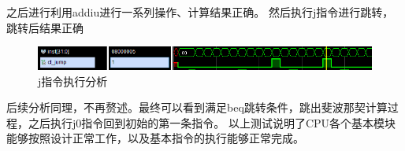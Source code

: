 \documentclass[]{USTBReport}
\begin{document}
    之后进行利用addiu进行一系列操作、计算结果正确。
    然后执行j指令进行跳转，跳转后结果正确
    \begin{figure}[H]
        \centering
        \includegraphics[width=\linewidth]{figure/image11}
        \caption{j指令执行分析}
    \end{figure}

    后续分析同理，不再赘述。最终可以看到满足beq跳转条件，跳出斐波那契计算过程，之后执行j0指令回到初始的第一条指令。
    以上测试说明了CPU各个基本模块能够按照设计正常工作，以及基本指令的执行能够正常完成。
\end{document}
